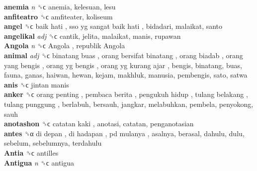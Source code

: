 \textbf{anemia} \emph{n}  ␝ϲ  anemia, kelesuan, lesu  \\
\textbf{anfiteatro} ␝ϲ  amfiteater, koliseum  \\
\textbf{angel} ␝ϲ   baik hati ,  sso yg sangat baik hati , bidadari, malaikat, santo  \\
\textbf{angelikal} \emph{adj}  ␝ϲ  cantik, jelita, malaikat, manis, rupawan  \\
\textbf{Angola} \emph{n}  ␝ϲ   Angola ,  republik Angola   \\
\textbf{animal} \emph{adj}  ␝ϲ   binatang buas ,  orang bersifat binatang ,  orang biadab ,  orang yang bengis ,  orang yg bengis ,  orang yg kurang ajar , bengis, binatang, buas, fauna, ganas, haiwan, hewan, kejam, makhluk, manusia, pembengis, sato, satwa  \\
\textbf{anis} ␝ϲ   jintan manis   \\
\textbf{anker} ␝ϲ   orang penting ,  pembaca berita ,  pengukuh hidup ,  tulang belakang ,  tulang punggung , berlabuh, bersauh, jangkar, melabuhkan, pembela, penyokong, sauh  \\
\textbf{anotashon} ␝ϲ   catatan kaki , anotasi, catatan, penganotasian  \\
\textbf{antes} ␝α   di depan ,  di hadapan ,  pd mulanya , asalnya, berasal, dahulu, dulu, sebelum, sebelumnya, terdahulu  \\
\textbf{Antia} ␝ϲ  antilles  \\
\textbf{Antigua} \emph{n}  ␝ϲ  antigua  \\
